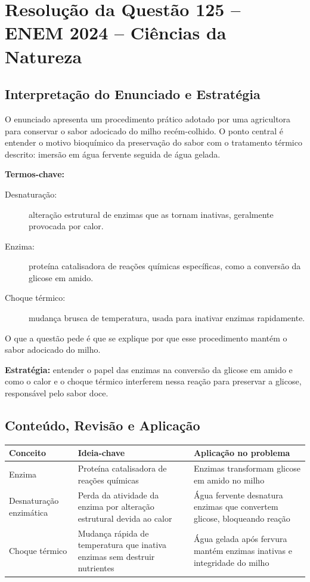 \documentclass{article}
\begin{document}
\section*{Resolução da Questão 125 – ENEM 2024 – Ciências da Natureza}

\subsection*{Interpretação do Enunciado e Estratégia}

O enunciado apresenta um procedimento prático adotado por uma agricultora para conservar o sabor adocicado do milho recém-colhido. O ponto central é entender o motivo bioquímico da preservação do sabor com o tratamento térmico descrito: imersão em água fervente seguida de água gelada.

\textbf{Termos-chave:}

\begin{description}
  \item[Desnaturação:] alteração estrutural de enzimas que as tornam inativas, geralmente provocada por calor.
  \item[Enzima:] proteína catalisadora de reações químicas específicas, como a conversão da glicose em amido.
  \item[Choque térmico:] mudança brusca de temperatura, usada para inativar enzimas rapidamente.
\end{description}

O que a questão pede é que se explique por que esse procedimento mantém o sabor adocicado do milho.

\textbf{Estratégia:} entender o papel das enzimas na conversão da glicose em amido e como o calor e o choque térmico interferem nessa reação para preservar a glicose, responsável pelo sabor doce.

\subsection*{Conteúdo, Revisão e Aplicação}

\begin{center}
\begin{tabular}{|l|p{6cm}|p{6cm}|}
\hline
\textbf{Conceito} & \textbf{Ideia-chave} & \textbf{Aplicação no problema} \\
\hline
Enzima & Proteína catalisadora de reações químicas & Enzimas transformam glicose em amido no milho \\
\hline
Desnaturação enzimática & Perda da atividade da enzima por alteração estrutural devida ao calor & Água fervente desnatura enzimas que convertem glicose, bloqueando reação \\
\hline
Choque térmico & Mudança rápida de temperatura que inativa enzimas sem destruir nutrientes & Água gelada após fervura mantém enzimas inativas e integridade do milho \\
\hline
\end{tabular}
\end{center}
\end{document}
